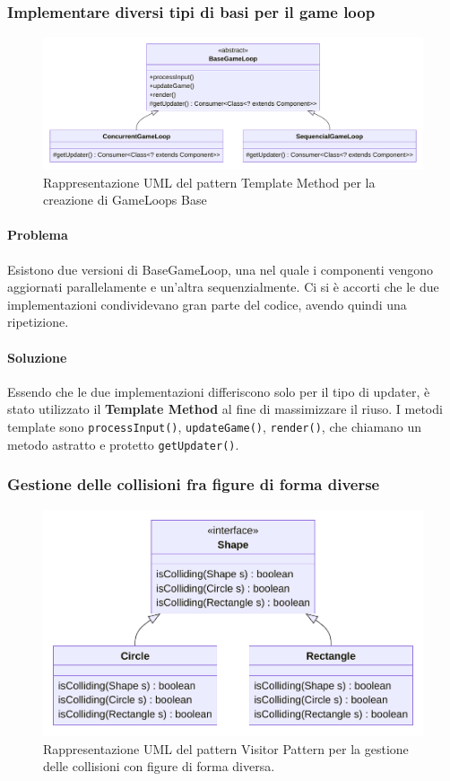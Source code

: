 \documentclass[a4paper,12pt]{report}
\begin{document}
\subsubsection*{Implementare diversi tipi di basi per il game loop}
%
\begin{figure}[H]
	\centering{}
	\includegraphics[scale=0.75]{img/TemplateMethodOnBaseGameLoop.pdf}
	\caption{Rappresentazione UML del pattern Template Method per la creazione di GameLoops Base}
	\label{img:strategy}
	\end{figure}
%
\paragraph*{Problema} Esistono due versioni di BaseGameLoop, una nel quale i componenti vengono aggiornati parallelamente e un'altra sequenzialmente.
Ci si è accorti che le due implementazioni condividevano gran parte del codice, avendo quindi una ripetizione.
%
\paragraph*{Soluzione} Essendo che le due implementazioni differiscono solo per il tipo di updater, è stato utilizzato il \textbf{Template Method} al fine di massimizzare il riuso.
I metodi template sono \texttt{processInput()}, \texttt{updateGame()}, \texttt{render()}, che chiamano un metodo astratto e protetto \texttt{getUpdater()}. 
%
\subsubsection*{Gestione delle collisioni fra figure di forma diverse}
%
\begin{figure}[H]
	\centering{}
	\includegraphics[scale=0.75]{img/VisitorPattern.pdf}
	\caption{Rappresentazione UML del pattern Visitor Pattern per la gestione delle collisioni con figure di forma diversa.}
	\label{img:strategy}
	\end{figure}
%
\end{document}
